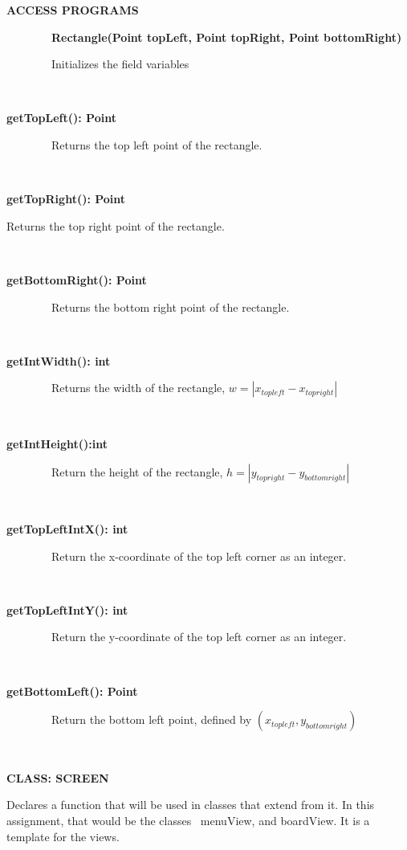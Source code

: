 \documentclass{article}
\begin{document}
{{\textbf{ACCESS PROGRAMS}}

{~~~~~~~~}{\textbf{Rectangle(Point topLeft, Point topRight, Point bottomRight)}}

{~~~~~~~~Initializes the field variables}

{~~~~~~~~}

{\textbf{getTopLeft(): Point}}

{~~~~~~~~Returns the top left point of the rectangle.}

{~~~~~~~~}

{\textbf{getTopRight(): Point}}

{Returns the top right point of the rectangle. }

{~~~~~~~~~~~~~~~~}

{\textbf{getBottomRight(): Point}}

{~~~~~~~~Returns the bottom right point of the rectangle.}

{~~~~~~~~~~~~~~~~}

{\textbf{getIntWidth(): int}}

{~~~~~~~~Returns the width of the rectangle, \(w = |x_{top left} - x_{top right}|\)}

{~~~~~~~~~~~~~~~~}

{\textbf{getIntHeight():int }}

{~~~~~~~~Return the height of the rectangle, \(h = |y_{top right} - y_{bottom right}|\)}

{~~~~~~~~~~~~~~~~}

{\textbf{getTopLeftIntX(): int}}

{~~~~~~~~Return the x-coordinate of the top left corner as an integer.}

{~~~~~~~~~~~~~~~~}

{\textbf{getTopLeftIntY(): int}}

{~~~~~~~~Return the y-coordinate of the top left corner as an integer.}

{~~~~~~~~~~~~~~~~}

{\textbf{getBottomLeft(): Point}}

{~~~~~~~~Return the bottom left point, defined by \((x_{top left}, y_{bottom right})\)}

{~~~~~~~~}

{\textbf{CLASS: SCREEN}}

{Declares a function that will be used in classes that extend from it.
In this assignment, that would be the classes ~menuView, and boardView.
It is a template for the views. }

{}

}
\end{document}
